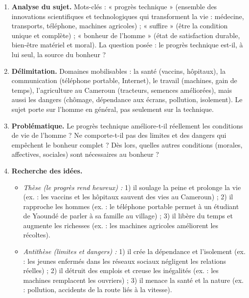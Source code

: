 \documentclass[11pt]{article}
\begin{document}
\begin{corrige}

\begin{enumerate}
\item \textbf{Analyse du sujet.} Mots-clés : « progrès technique » (ensemble des innovations scientifiques et technologiques qui transforment la vie : médecine, transports, téléphone, machines agricoles) ; « suffire » (être la condition unique et complète) ; « bonheur de l'homme » (état de satisfaction durable, bien-être matériel et moral). La question posée : le progrès technique est-il, à lui seul, la source du bonheur ?

\item \textbf{Délimitation.} Domaines mobilisables : la santé (vaccins, hôpitaux), la communication (téléphone portable, Internet), le travail (machines, gain de temps), l'agriculture au Cameroun (tracteurs, semences améliorées), mais aussi les dangers (chômage, dépendance aux écrans, pollution, isolement). Le sujet porte sur l'homme en général, pas seulement sur la technique.

\item \textbf{Problématique.} Le progrès technique améliore-t-il réellement les conditions de vie de l'homme ? Ne comporte-t-il pas des limites et des dangers qui empêchent le bonheur complet ? Dès lors, quelles autres conditions (morales, affectives, sociales) sont nécessaires au bonheur ?

\item \textbf{Recherche des idées.}
\begin{itemize}
\item \emph{Thèse (le progrès rend heureux) :} 1) il soulage la peine et prolonge la vie (ex. : les vaccins et les hôpitaux sauvent des vies au Cameroun) ; 2) il rapproche les hommes (ex. : le téléphone portable permet à un étudiant de Yaoundé de parler à sa famille au village) ; 3) il libère du temps et augmente les richesses (ex. : les machines agricoles améliorent les récoltes).
\item \emph{Antithèse (limites et dangers) :} 1) il crée la dépendance et l'isolement (ex. : les jeunes enfermés dans les réseaux sociaux négligent les relations réelles) ; 2) il détruit des emplois et creuse les inégalités (ex. : les machines remplacent les ouvriers) ; 3) il menace la santé et la nature (ex. : pollution, accidents de la route liés à la vitesse).
\end{itemize}


\end{enumerate}
\end{corrige}
\end{document}
